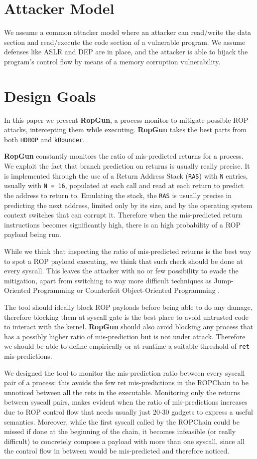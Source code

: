 \documentclass[11pt]{article}
\begin{document}
\section{Attacker Model}
We assume a common attacker model where an attacker can read/write the data section and read/execute the code section of a vulnerable program. We assume defenses like ASLR and DEP are in place, and the attacker is able to hijack the program’s control flow by means of a memory corruption vulnerability.


\section{Design Goals}
In this paper we present {\bf RopGun}, a process monitor to mitigate possible ROP attacks, intercepting them while executing. {\bf RopGun} takes the best parts from both {\tt HDROP} and {\tt kBouncer}.

{\bf RopGun} constantly monitors the ratio of mis-predicted returns for a process. We exploit the fact that branch prediction on returns is usually really precise. It is implemented through the use of a Return Address Stack ({\tt RAS}) with {\tt N} entries, usually with {\tt N = 16}, populated at each call and read at each return to predict the address to return to. Emulating the stack, the  {\tt RAS} is usually precise in predicting the next address, limited only by its size, and by the operating system context switches that can corrupt it. Therefore when the mis-predicted return instructions becomes significantly high, there is an high probability of a ROP payload being run.

While we think that inspecting the ratio of mis-predicted returns is the best way to spot a ROP payload executing, we think that such check should be done at every syscall. This leaves the attacker with no or few possibility to evade the mitigation, apart from switching to way more difficult techniques as Jump-Oriented Programming \cite{jop} or Counterfeit Object-Oriented Programming \cite{coop}.

The tool should ideally block ROP payloads before being able to do any damage, therefore blocking them at syscall gate is the best place to avoid untrusted code to interact with the kernel. {\bf RopGun} should also avoid blocking any process that has a possibly higher ratio of mis-prediction but is not under attack. Therefore we should be able to define empirically or at runtime a suitable threshold of {\tt ret} mis-predictions.

\bigskip
We designed the tool to monitor the mis-prediction ratio between every syscall pair of a process: this avoids the few ret mis-predictions in the ROPChain to be unnoticed between all the rets in the executable. Monitoring only the returns between syscall pairs, makes evident when the ratio of mis-predictions increases due to ROP control flow that needs usually just 20-30 gadgets to express a useful semantics. Moreover, while the first syscall called by the ROPChain could be missed if done at the beginning of the chain, it becomes infeasible (or really difficult) to concretely compose a payload with more than one syscall, since all the control flow in between would be mis-predicted and therefore noticed.
\end{document}
